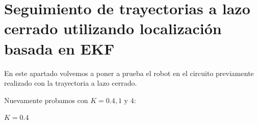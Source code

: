 \section{Seguimiento de trayectorias a lazo cerrado utilizando localización basada en EKF}

En este apartado volvemos a poner a prueba el robot en el circuito previamente realizado con la trayectoria a lazo cerrado.

Nuevamente probamos con $K= 0.4,1$ y $4$:

$K=0.4$




